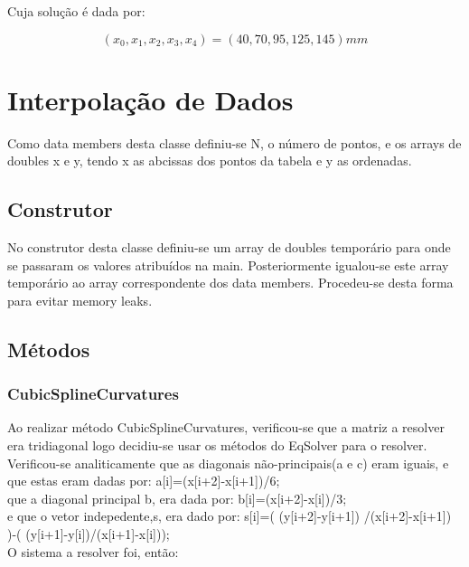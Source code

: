 \documentclass{article}
\begin{document}
\begin{multicols}{2}
  Cuja solução é dada por:

  \begin{equation}
    (x_0, x_1, x_2, x_3, x_4) = (40, 70, 95, 125, 145) mm
  \end{equation}

  \section{Interpolação de Dados}
  \par
  Como data members desta classe definiu-se N, o número de pontos, e os arrays de doubles x e y, tendo x as abcissas dos pontos da tabela e y as ordenadas.

  \subsection{Construtor}

  No construtor desta classe definiu-se um array de doubles temporário para onde se passaram os valores atribuídos na main. Posteriormente igualou-se este array temporário ao array correspondente dos data members. Procedeu-se desta forma para evitar memory leaks.

  \subsection{M\'etodos}
  \subsubsection{CubicSplineCurvatures}
  Ao realizar método CubicSplineCurvatures, verificou-se que a matriz a resolver era tridiagonal logo decidiu-se usar os métodos do EqSolver para o resolver. Verificou-se analiticamente que as diagonais não-principais(a e c) eram iguais, e que estas eram dadas por:  
  a[i]=(x[i+2]-x[i+1])/6; \\
  que a diagonal principal b, era dada por:
   b[i]=(x[i+2]-x[i])/3;\\
   e que o vetor indepedente,s, era dado por:
   s[i]=( (y[i+2]-y[i+1]) /(x[i+2]-x[i+1]) )-( (y[i+1]-y[i])/(x[i+1]-x[i])); \\
  
  O sistema a resolver foi, então:
  

\end{multicols}
\end{document}
